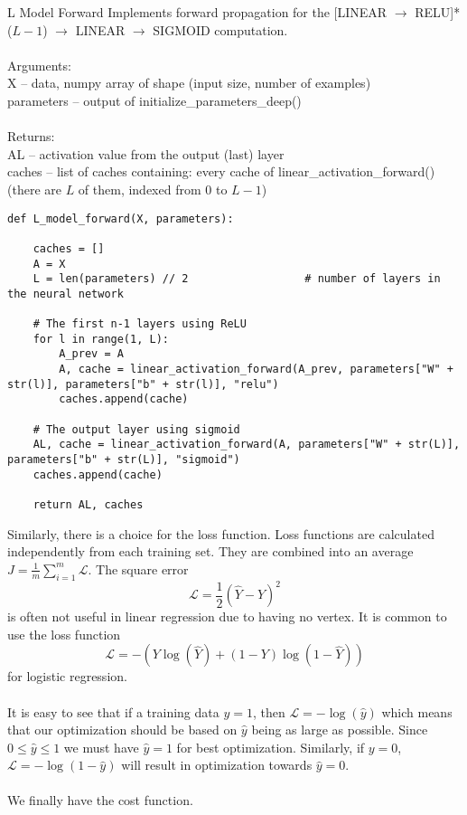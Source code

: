 \documentclass[a4paper]{article}
\begin{document}
\begin{alg}{L Model Forward}{} Implements forward propagation for the [LINEAR $\to$ RELU]*($L-1$) $\to$ LINEAR $\to$ SIGMOID computation. \\~\\
Arguments:\\
X -- data, numpy array of shape (input size, number of examples)\\
parameters -- output of initialize\_parameters\_deep()\\~\\

Returns:\\
AL -- activation value from the output (last) layer\\
caches -- list of caches containing: every cache of linear\_activation\_forward() (there are $L$ of them, indexed from $0$ to $L-1$)\\
\begin{verbatim}
def L_model_forward(X, parameters):

    caches = []
    A = X
    L = len(parameters) // 2                  # number of layers in the neural network
    
    # The first n-1 layers using ReLU
    for l in range(1, L):
        A_prev = A 
        A, cache = linear_activation_forward(A_prev, parameters["W" + str(l)], parameters["b" + str(l)], "relu")
        caches.append(cache)

    # The output layer using sigmoid
    AL, cache = linear_activation_forward(A, parameters["W" + str(L)], parameters["b" + str(L)], "sigmoid")
    caches.append(cache)
          
    return AL, caches
\end{verbatim}
\end{alg}

Similarly, there is a choice for the loss function. Loss functions are calculated independently from each training set. They are combined into an average $J=\frac{1}{m}\sum_{i=1}^m\mathcal{L}$. The square error $$\mathcal{L}=\frac{1}{2}(\hat{Y}-Y)^2$$ is often not useful in linear regression due to having no vertex. It is common to use the loss function $$\mathcal{L}=-(Y\log(\hat{Y})+(1-Y)\log(1-\hat{Y}))$$ for logistic regression. \\~\\
It is easy to see that if a training data $y=1$, then $\mathcal{L}=-\log(\hat{y})$ which means that our optimization should be based on $\hat{y}$ being as large as possible. Since $0\leq \hat{y}\leq 1$ we must have $\hat{y}=1$ for best optimization. Similarly, if $y=0$, $\mathcal{L}=-\log(1-\hat{y})$ will result in optimization towards $\hat{y}=0$. \\~\\
We finally have the cost function. 
\end{document}
